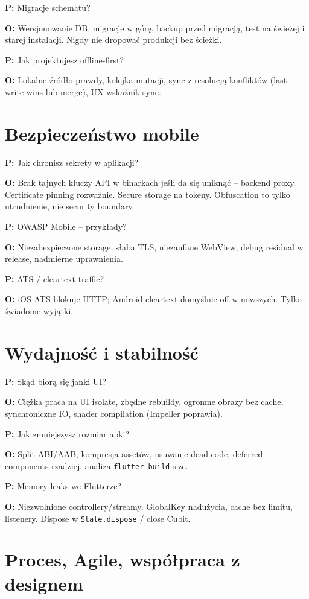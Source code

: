 \documentclass[11pt,a4paper]{article}
\newcommand{\pyt}[1]{\par\medskip\noindent\textbf{P:} #1\par}
\newcommand{\odp}[1]{\noindent\textbf{O:} #1\par}
\begin{document}
\pyt{Migracje schematu?}
\odp{Wersjonowanie DB, migracje w górę, backup przed migracją, test na świeżej i starej instalacji. Nigdy nie dropować produkcji bez ścieżki.}

\pyt{Jak projektujesz offline-first?}
\odp{Lokalne źródło prawdy, kolejka mutacji, sync z resolucją konfliktów (last-write-wins lub merge), UX wskaźnik sync.}

\section{Bezpieczeństwo mobile}

\pyt{Jak chronisz sekrety w aplikacji?}
\odp{Brak tajnych kluczy API w binarkach jeśli da się uniknąć -- backend proxy. Certificate pinning rozważnie. Secure storage na tokeny. Obfuscation to tylko utrudnienie, nie security boundary.}

\pyt{OWASP Mobile -- przykłady?}
\odp{Niezabezpieczone storage, słaba TLS, niezaufane WebView, debug residual w release, nadmierne uprawnienia.}

\pyt{ATS / cleartext traffic?}
\odp{iOS ATS blokuje HTTP; Android cleartext domyślnie off w nowszych. Tylko świadome wyjątki.}

\section{Wydajność i stabilność}

\pyt{Skąd biorą się janki UI?}
\odp{Ciężka praca na UI isolate, zbędne rebuildy, ogromne obrazy bez cache, synchroniczne IO, shader compilation (Impeller poprawia).}

\pyt{Jak zmniejszysz rozmiar apki?}
\odp{Split ABI/AAB, kompresja assetów, usuwanie dead code, deferred components rzadziej, analiza \texttt{flutter build} size.}

\pyt{Memory leaks we Flutterze?}
\odp{Niezwolnione controllery/streamy, GlobalKey nadużycia, cache bez limitu, listenery. Dispose w \texttt{State.dispose} / close Cubit.}

\section{Proces, Agile, współpraca z designem}
\end{document}
